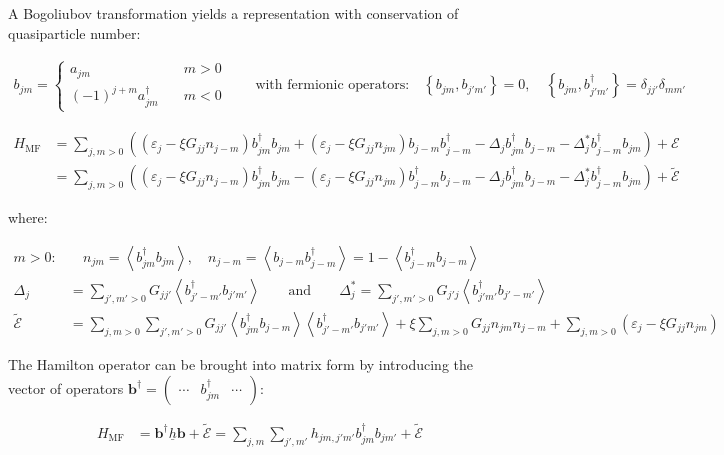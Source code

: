 \documentclass[8pt, a4paper]{article}
\newcommand{\expec}[1]{\left\langle#1\right\rangle}
\begin{document}
A Bogoliubov transformation yields a representation with conservation of quasiparticle number:

\begin{align*}
b_{jm} = \begin{cases}
a_{jm}\quad&m>0\\
(-1)^{j+m}a_{jm}^\dagger\quad&m<0
\end{cases}\qquad\text{with fermionic operators:}\quad
\left\{b_{jm},b_{j'm'}\right\}=0, \quad \left\{b_{jm},b_{j'm'}^\dagger\right\}=\delta_{jj'}\delta_{mm'}
\end{align*}

\begin{align*}
H_\mathrm{MF} &=
\sum_{j,m>0}\left(\left(\varepsilon_j-\xi G_{jj}n_{j-m}\right) b_{jm}^\dagger b_{jm} + \left(\varepsilon_j-\xi G_{jj}n_{jm}\right) b_{j-m} b_{j-m}^\dagger - \Delta_j b_{jm}^\dagger b_{j-m} - \Delta_j^* b_{j-m}^\dagger b_{jm}\right)+\mathcal E
\\&=
\sum_{j,m>0}\left(\left(\varepsilon_j-\xi G_{jj}n_{j-m}\right) b_{jm}^\dagger b_{jm} - \left(\varepsilon_j-\xi G_{jj}n_{jm}\right) b_{j-m}^\dagger b_{j-m} - \Delta_j b_{jm}^\dagger b_{j-m} - \Delta_j^* b_{j-m}^\dagger b_{jm}\right)+\widetilde{\mathcal E}
\end{align*}

where:

\begin{align*}
m>0:&\quad n_{jm} = \expec{b_{jm}^\dagger b_{jm}}, \quad n_{j-m} = \expec{b_{j-m}b_{j-m}^\dagger} = 1 - \expec{b_{j-m}^\dagger b_{j-m}}
\\
\Delta_j &= \sum_{j',m'>0} G_{jj'}\expec{b_{j'-m'}^\dagger b_{j'm'}}
\qquad\text{and}\qquad
\Delta_j^* = \sum_{j',m'>0} G_{j'j}\expec{b_{j'm'}^\dagger b_{j'-m'}}
\\
\widetilde{\mathcal E} &= \sum_{j,m>0}\sum_{j',m'>0}G_{jj'}\expec{b_{jm}^\dagger b_{j-m}}\expec{b_{j'-m'}^\dagger b_{j'm'}}+\xi\sum_{j,m>0}G_{jj}n_{jm}n_{j-m}+\sum_{j,m>0}\left(\varepsilon_j-\xi G_{jj}n_{jm}\right)
\end{align*}

The Hamilton operator can be brought into matrix form by introducing the vector of operators $\boldsymbol b^\dagger = \begin{pmatrix}\cdots&b_{jm}^\dagger&\cdots\end{pmatrix}$:

\begin{align*}
H_\mathrm{MF} &=\boldsymbol b^\dagger \underline h \boldsymbol b +\widetilde{\mathcal E}= \sum_{j,m}\sum_{j',m'}h_{jm,j'm'}b_{jm}^\dagger b_{jm'} + \widetilde{\mathcal E}
\end{align*}
\end{document}
